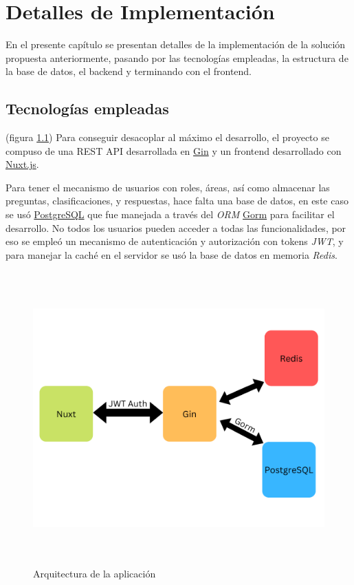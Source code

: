 \chapter{Detalles de Implementación}\label{chapter:implementation}

En el presente capítulo se presentan detalles de la implementación de la solución propuesta anteriormente, pasando por las tecnologías empleadas, la estructura de la base de datos, el backend y terminando con el frontend.
\newline

\section{Tecnologías empleadas}

(figura \ref{fig:arquitecture}) Para conseguir desacoplar al máximo el desarrollo, el proyecto se compuso de una REST API desarrollada en \href{https://gin-gonic.com/}{Gin} y un frontend desarrollado con \href{https://nuxtjs.org/}{Nuxt.js}.
\newline

Para tener el mecanismo de usuarios con roles, áreas, así como almacenar las preguntas, clasificaciones, y respuestas, hace falta una base de datos, en este caso se usó \href{https://www.postgresql.org/}{PostgreSQL} que fue manejada a través del \textit{ORM} \href{https://gorm.io/}{Gorm} para facilitar el desarrollo. No todos los usuarios pueden acceder a todas las funcionalidades, por eso se empleó un mecanismo de autenticación y autorización con tokens \textit{JWT}, y para manejar la caché en el servidor se usó la base de datos en memoria \textit{Redis}.
\newline


\begin{figure}[h]
	\includegraphics[width=15cm, height=11.25cm]{arquitecture.png}
	\caption{Arquitectura de la aplicación}
	\label{fig:arquitecture}
\end{figure}


